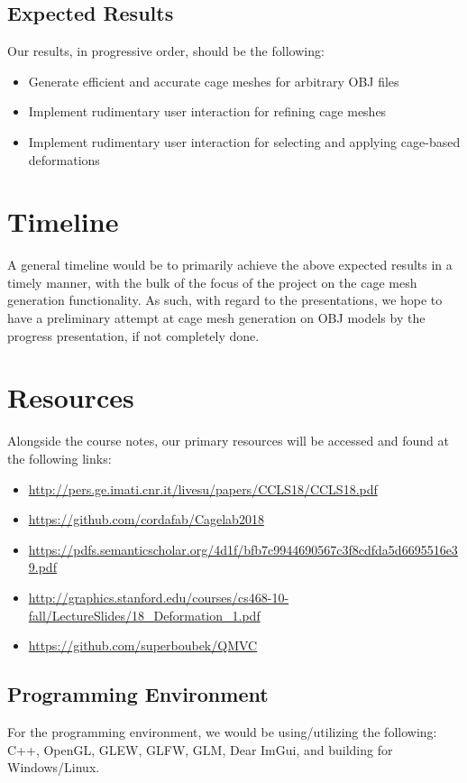 \documentclass[11pt]{article}
\begin{document}
\subsection{Expected Results}
Our results, in progressive order, should be the following:
\begin{itemize}
 \item Generate efficient and accurate cage meshes for arbitrary OBJ files
 \item Implement rudimentary user interaction for refining cage meshes
 \item Implement rudimentary user interaction for selecting and applying cage-based deformations
\end{itemize}

\section{Timeline}
A general timeline would be to primarily achieve the above expected results in a timely manner, with the bulk of the focus of the project on the cage mesh generation functionality. As such, with regard to the presentations, we hope to have a preliminary attempt at cage mesh generation on OBJ models by the progress presentation, if not completely done. 
\section{Resources}
Alongside the course notes, our primary resources will be accessed and found at the following links:
 \begin{itemize}
  \item \url{http://pers.ge.imati.cnr.it/livesu/papers/CCLS18/CCLS18.pdf}
  \item \url{https://github.com/cordafab/Cagelab2018}
  \item \url{https://pdfs.semanticscholar.org/4d1f/bfb7c9944690567c3f8cdfda5d6695516e39.pdf}
  \item \url{http://graphics.stanford.edu/courses/cs468-10-fall/LectureSlides/18_Deformation_1.pdf}
  \item \url{https://github.com/superboubek/QMVC}
 \end{itemize}

 
 
 


\subsection{Programming Environment}
For the programming environment, we would be using/utilizing the following: C++, OpenGL, GLEW, GLFW, GLM, Dear ImGui, and building for Windows/Linux.
\end{document}
